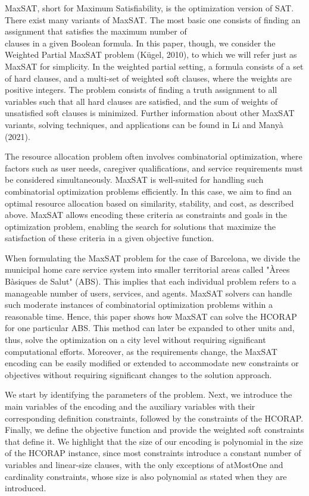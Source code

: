 \documentclass[10pt]{article}
\begin{document}
MaxSAT, short for Maximum Satisfiability, is the optimization version of SAT. There exist many variants of MaxSAT. The most basic one consists of finding an assignment that satisfies the maximum number of\\
clauses in a given Boolean formula. In this paper, though, we consider the Weighted Partial MaxSAT problem (Kügel, 2010), to which we will refer just as MaxSAT for simplicity. In the weighted partial setting, a formula consists of a set of hard clauses, and a multi-set of weighted soft clauses, where the weights are positive integers. The problem consists of finding a truth assignment to all variables such that all hard clauses are satisfied, and the sum of weights of unsatisfied soft clauses is minimized. Further information about other MaxSAT variants, solving techniques, and applications can be found in Li and Manyà (2021).

The resource allocation problem often involves combinatorial optimization, where factors such as user needs, caregiver qualifications, and service requirements must be considered simultaneously. MaxSAT is well-suited for handling such combinatorial optimization problems efficiently. In this case, we aim to find an optimal resource allocation based on similarity, stability, and cost, as described above. MaxSAT allows encoding these criteria as constraints and goals in the optimization problem, enabling the search for solutions that maximize the satisfaction of these criteria in a given objective function.

When formulating the MaxSAT problem for the case of Barcelona, we divide the municipal home care service system into smaller territorial areas called "Àrees Bàsiques de Salut" (ABS). This implies that each individual problem refers to a manageable number of users, services, and agents. MaxSAT solvers can handle such moderate instances of combinatorial optimization problems within a reasonable time. Hence, this paper shows how MaxSAT can solve the HCORAP for one particular ABS. This method can later be expanded to other units and, thus, solve the optimization on a city level without requiring significant computational efforts. Moreover, as the requirements change, the MaxSAT encoding can be easily modified or extended to accommodate new constraints or objectives without requiring significant changes to the solution approach.

We start by identifying the parameters of the problem. Next, we introduce the main variables of the encoding and the auxiliary variables with their corresponding definition constraints, followed by the constraints of the HCORAP. Finally, we define the objective function and provide the weighted soft constraints that define it. We highlight that the size of our encoding is polynomial in the size of the HCORAP instance, since most constraints introduce a constant number of variables and linear-size clauses, with the only exceptions of atMostOne and cardinality constraints, whose size is also polynomial as stated when they are introduced.
\end{document}
